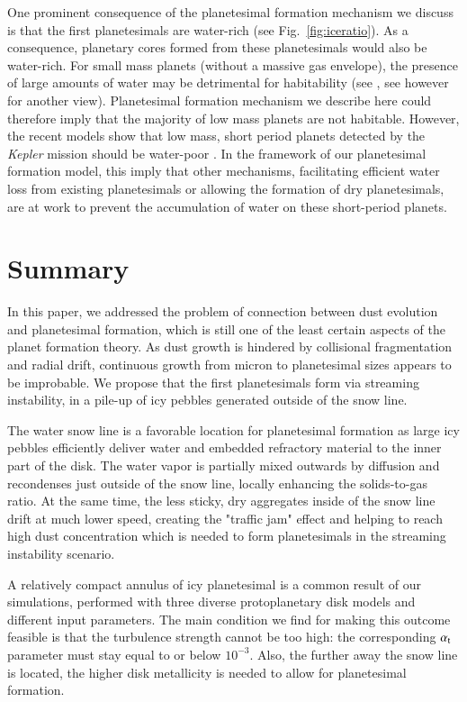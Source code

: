 \documentclass{aa}
\begin{document}
One prominent consequence of the planetesimal formation mechanism we discuss is that the first planetesimals are water-rich (see Fig.~\ref{fig:iceratio}). 
As a consequence, planetary cores formed from these planetesimals would also be water-rich. For small mass planets (without a massive gas 
envelope), the presence of large amounts of water may be detrimental for habitability (see \citet{2013A&A...558A.109A, 2015MNRAS.452.3752K}, see however \citet{2017ApJ...838...24L} for another view). Planetesimal formation mechanism we describe here could therefore imply that the majority 
of low mass planets are not habitable. However, the recent models show that low mass, short period planets detected by the {\it Kepler} mission should be water-poor \citep[see e.g.][]{2017arXiv170600251J}. In the framework of our planetesimal formation model, this imply that other mechanisms, facilitating efficient water loss from existing planetesimals or allowing the formation of dry planetesimals, are at work to prevent the accumulation of water on these short-period planets.

\section{Summary}\label{sub:summary}

In this paper, we addressed the problem of connection between dust evolution and planetesimal formation, which is still one of the least certain aspects of the planet formation theory. As dust growth is hindered by collisional fragmentation and radial drift, continuous growth from micron to planetesimal sizes appears to be improbable. We propose that the first planetesimals form via streaming instability, in a pile-up of icy pebbles generated outside of the snow line. 

The water snow line is a favorable location for planetesimal formation as large icy pebbles efficiently deliver water and embedded refractory material to the inner part of the disk. The water vapor is partially mixed outwards by diffusion and recondenses just outside of the snow line, locally enhancing the solids-to-gas ratio. At the same time, the less sticky, dry aggregates inside of the snow line drift at much lower speed, creating the "traffic jam" effect and helping to reach high dust concentration which is needed to form planetesimals in the streaming instability scenario. 

A relatively compact annulus of icy planetesimal is a common result of our simulations, performed with three diverse protoplanetary disk models and different input parameters. The main condition we find for making this outcome feasible is that the turbulence strength cannot be too high: the corresponding $\alpha_{\rm t}$ parameter must stay equal to or below $10^{-3}$. Also, the further away the snow line is located, the higher disk metallicity is needed to allow for planetesimal formation.
\end{document}
